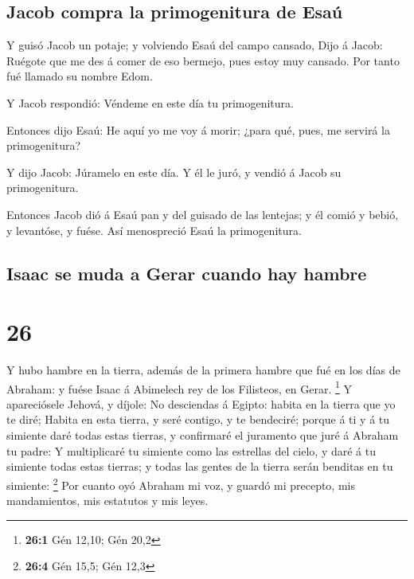 \hypertarget{jacob-compra-la-primogenitura-de-esauxfa}{%
\subsection{Jacob compra la primogenitura de
Esaú}\label{jacob-compra-la-primogenitura-de-esauxfa}}

 Y guisó Jacob un potaje; y volviendo Esaú del campo
cansado,  Dijo á Jacob: Ruégote que me des á comer de eso
bermejo, pues estoy muy cansado. Por tanto fué llamado su nombre Edom.

 Y Jacob respondió: Véndeme en este día tu primogenitura.

 Entonces dijo Esaú: He aquí yo me voy á morir; ¿para
qué, pues, me servirá la primogenitura?

 Y dijo Jacob: Júramelo en este día. Y él le juró, y
vendió á Jacob su primogenitura.

 Entonces Jacob dió á Esaú pan y del guisado de las
lentejas; y él comió y bebió, y levantóse, y fuése. Así menospreció Esaú
la primogenitura.

\hypertarget{isaac-se-muda-a-gerar-cuando-hay-hambre}{%
\subsection{Isaac se muda a Gerar cuando hay
hambre}\label{isaac-se-muda-a-gerar-cuando-hay-hambre}}

\hypertarget{section-25}{%
\section{26}\label{section-25}}

 Y hubo hambre en la tierra, además de la primera hambre
que fué en los días de Abraham: y fuése Isaac á Abimelech rey de los
Filisteos, en Gerar. \footnote{\textbf{26:1} Gén 12,10; Gén 20,2}
 Y apareciósele Jehová, y díjole: No desciendas á Egipto:
habita en la tierra que yo te diré;  Habita en esta
tierra, y seré contigo, y te bendeciré; porque á ti y á tu simiente daré
todas estas tierras, y confirmaré el juramento que juré á Abraham tu
padre:  Y multiplicaré tu simiente como las estrellas del
cielo, y daré á tu simiente todas estas tierras; y todas las gentes de
la tierra serán benditas en tu simiente: \footnote{\textbf{26:4} Gén
  15,5; Gén 12,3}  Por cuanto oyó Abraham mi voz, y guardó
mi precepto, mis mandamientos, mis estatutos y mis leyes.

